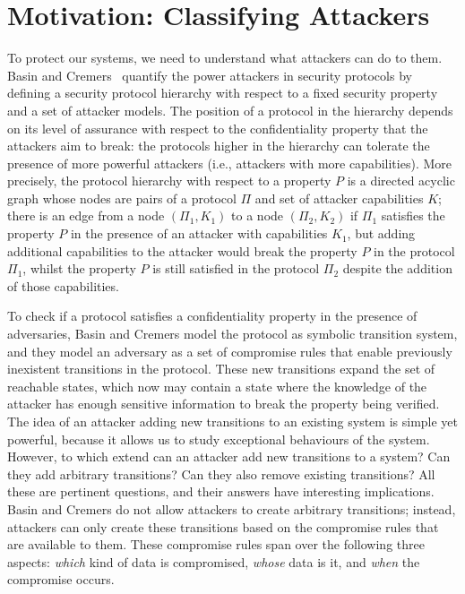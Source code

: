 \section{Motivation: Classifying Attackers} 
To protect our systems, we need to understand what attackers can do to them. Basin and Cremers~\cite{KnowYourEnemy} quantify the power attackers in security protocols by defining a security protocol hierarchy with respect to a fixed security property and a set of attacker models. %
The position of a protocol in the hierarchy depends on its level of assurance with respect to the confidentiality property that the attackers aim to break: the protocols higher in the hierarchy can tolerate the presence of more powerful attackers (i.e., attackers with more capabilities). More precisely, the protocol hierarchy with respect to a property $P$ is a directed acyclic graph whose nodes are pairs of a protocol $\Pi$ and set of attacker capabilities $K$; there is an edge from a node $(\Pi_1,K_1)$ to a node $(\Pi_2,K_2)$ if $\Pi_1$ satisfies the property $P$ in the presence of an attacker with capabilities $K_1$, but adding additional capabilities to the attacker would break the property $P$ in the protocol $\Pi_1$, whilst the property $P$ is still satisfied in the protocol $\Pi_2$ despite the addition of those capabilities.

To check if a protocol satisfies a confidentiality property in the presence of adversaries, Basin and Cremers model the protocol as symbolic transition system, and they model an adversary as a set of compromise rules that enable previously inexistent transitions in the protocol. These new transitions expand the set of reachable states, which now may contain a state where the knowledge of the attacker has enough sensitive information to break the property being verified. The idea of an attacker adding new transitions to an existing system is simple yet powerful, because it allows us to study exceptional behaviours of the system. However, to which extend can an attacker add new transitions to a system? Can they add arbitrary transitions? Can they also remove existing transitions? All these are pertinent questions, and their answers have interesting implications. Basin and Cremers do not allow attackers to create arbitrary transitions; instead, attackers can only create these transitions based on the compromise rules that are available to them. These compromise rules span over the following three aspects: \emph{which} kind of data is compromised, \emph{whose} data is it, and \emph{when} the compromise occurs. 

